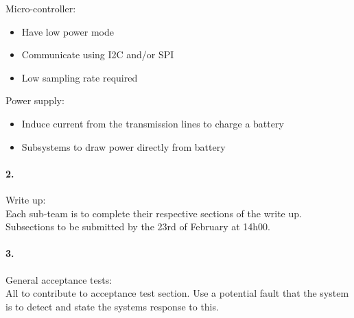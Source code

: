 \documentclass[12pt]{article}
\begin{document}
Micro-controller:
\begin{itemize}
  \item Have low power mode
  \item Communicate using I2C and/or SPI
  \item Low sampling rate required
\end{itemize}

Power supply:
\begin{itemize}
  \item Induce current from the transmission lines to charge a battery
  \item Subsystems to draw power directly from battery
\end{itemize}

\paragraph[short]{2.} Write up:\\
Each sub-team is to complete their respective sections of the write up.
Subsections to be submitted by the 23rd of February at 14h00.

\paragraph[short]{3.} General acceptance tests:\\
All to contribute to acceptance test section. Use a potential fault that the system is to detect and state the
systems response to this.

%
%
\end{document}
